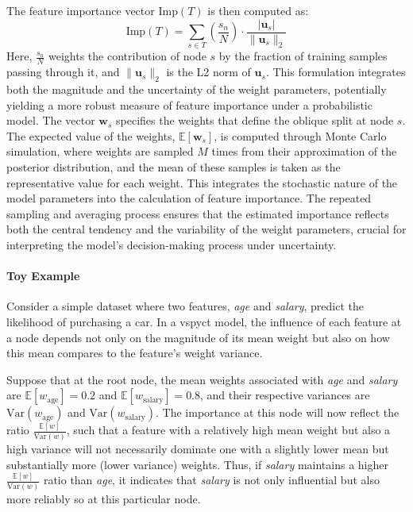 \documentclass[3p,review,authoryear]{elsarticle}
\begin{document}
The feature importance vector \(\text{Imp}(T)\) is then computed as:
\begin{equation}\label{eq:fimp}
\text{Imp}(T) = \sum_{s \in T} \left( \frac{s_n}{N} \right) \cdot \frac{|\mathbf{u}_s|}{\|\mathbf{u}_s\|_2}
\end{equation}
Here, \(\frac{s_n}{N}\) weights the contribution of node \(s\) by the fraction of training samples passing through it, and \(\|\mathbf{u}_s\|_2\) is the L2 norm of \(\mathbf{u}_s\).
This formulation integrates both the magnitude and the uncertainty of the weight parameters, potentially yielding a more robust measure of feature importance under a probabilistic model.
The vector $\mathbf{w}_s$ specifies the weights that define the oblique split at node $s$.
The expected value of the weights, $\mathbb{E}[\mathbf{w}_s]$, is computed through Monte Carlo simulation, where weights are sampled $M$ times from their approximation of the posterior distribution, and the mean of these samples is taken as the representative value for each weight.
This integrates the stochastic nature of the model parameters into the calculation of feature importance.
The repeated sampling and averaging process ensures that the estimated importance reflects both the central tendency and the variability of the weight parameters, crucial for interpreting the model's decision-making process under uncertainty.

\paragraph{Toy Example}
Consider a simple dataset where two features, \textit{age} and \textit{salary}, predict the likelihood of purchasing a car.
In a \gls{vspyct} model, the influence of each feature at a node depends not only on the magnitude of its mean weight but also on how this mean compares to the feature’s weight variance.

Suppose that at the root node, the mean weights associated with \textit{age} and \textit{salary} are \( \mathbb{E}[w_{\text{age}}] = 0.2 \) and \( \mathbb{E}[w_{\text{salary}}] = 0.8 \), and their respective variances are \( \text{Var}(w_{\text{age}}) \) and \( \text{Var}(w_{\text{salary}}) \).
The importance at this node will now reflect the ratio \( \frac{\mathbb{E}[w]}{\text{Var}(w)} \), such that a feature with a relatively high mean weight but also a high variance will not necessarily dominate one with a slightly lower mean but substantially more  (lower variance) weights.
Thus, if \textit{salary} maintains a higher \(\frac{\mathbb{E}[w]}{\text{Var}(w)}\) ratio than \textit{age}, it indicates that \textit{salary} is not only influential but also more reliably so at this particular node.
\end{document}
